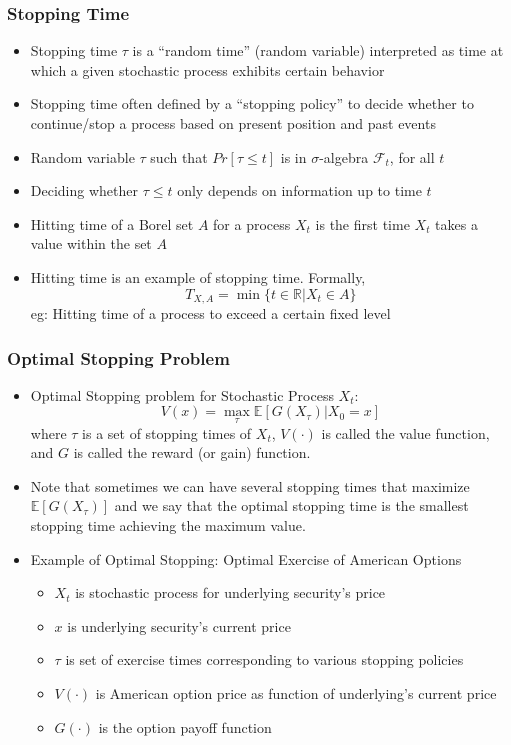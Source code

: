 \documentclass{beamer}
\begin{document}
\begin{frame}
\frametitle{Stopping Time}
\begin{itemize}
\item Stopping time $\tau$ is a ``random time'' (random variable) interpreted as time at which a given stochastic process exhibits certain behavior
\item Stopping time often defined by a ``stopping policy'' to decide whether to continue/stop a process based on present position and past events
\item Random variable $\tau$ such that $Pr[\tau \leq t]$ is in $\sigma$-algebra $\mathcal{F}_t$, for all $t$
\item Deciding whether $\tau \leq t$ only depends on information up to time $t$
\item Hitting time of a Borel set $A$ for a process $X_t$ is the first time $X_t$ takes a value within the set $A$
\item Hitting time is an example of stopping time. Formally, 
$$T_{X,A} = \min \{t \in \mathbb{R} | X_t \in A\}$$
eg: Hitting time of a process to exceed a certain fixed level
\end{itemize}
\end{frame}

\begin{frame}
\frametitle{Optimal Stopping Problem}
\begin{itemize}
\item Optimal Stopping problem for Stochastic Process $X_t$: 
$$V(x) = \max_{\tau} \mathbb{E}[G(X_{\tau})|X_0 = x]$$
 where $\tau$ is a set of stopping times of $X_t$, $V(\cdot)$ is called the value function, and $G$ is called the reward (or gain) function.
\item Note that sometimes we can have several stopping times that maximize $\mathbb{E}[G(X_{\tau})]$ and we say that the optimal stopping time
is the smallest stopping time achieving the maximum value.
\item Example of Optimal Stopping: Optimal Exercise of American Options
\begin{itemize}
\item $X_t$ is stochastic process for underlying security's price
\item $x$ is underlying security's current price
\item $\tau$ is set of exercise times corresponding to various stopping policies
\item $V(\cdot)$ is American option price as function of underlying's current price
\item $G(\cdot)$ is the option payoff function
\end{itemize}
\end{itemize}
\end{frame}
\end{document}
